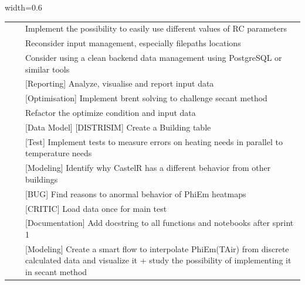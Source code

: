 \begin{table}[H]
\begin{adjustbox}{width=0.6\textwidth}
\begin{tabular}{p{5cm}p{5cm}p{8cm}}
                &
                &
                Implement the possibility to easily use different values of RC parameters \\

                &
                &
                Reconsider input management, especially filepaths locations \\

                &
                &
                Consider using a clean backend data management using PostgreSQL or similar tools \\

                &
                &
                    {[Reporting]} Analyze, visualise and report input data \\

                &
                &
                    {[Optimisation]} Implement brent solving to challenge secant method \\

                &
                &
                Refactor the optimize condition and input data \\

                &
                &
                    {[Data Model]} {[DISTRISIM]} Create a Building table \\

                &
                &
                    {[Test]} Implement tests to measure errors on heating needs in parallel to temperature needs \\

                &
                &
                    {[Modeling]} Identify why CastelR has a different behavior from other buildings \\

                &
                &
                    {[BUG]} Find reasons to anormal behavior of PhiEm heatmaps \\

                &
                &
                    {[CRITIC]} Load data once for main test \\

                &
                &
                    {[Documentation]} Add docstring to all functions and notebooks after sprint 1 \\

                &
                &
                    {[Modeling]} Create a smart flow to interpolate PhiEm(TAir) from discrete calculated data and visualize it + study the possibility of implementing it in secant method \\


\end{tabular}
\end{adjustbox}
\end{table}
